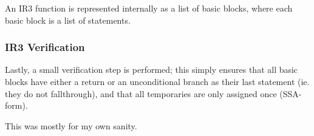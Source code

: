 \documentclass[12pt]{article}
\begin{document}
An IR3 function is represented internally as a list of basic blocks, where each basic block is a list of statements.


\subsubsection{IR3 Verification}

Lastly, a small verification step is performed; this simply ensures that all basic blocks have either a return or
an unconditional branch as their last statement (ie. they do not fallthrough), and that all temporaries are only
assigned once (SSA-form).

This was mostly for my own sanity.

\end{document}
